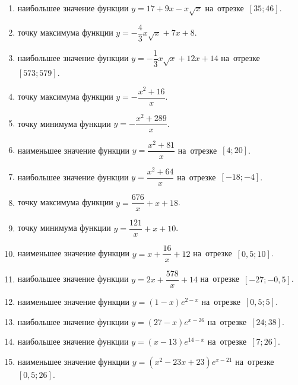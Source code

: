 \documentclass[a4paper,10pt]{article}
\begin{document}
\begin{enumerate}
\item {} наибольшее значение функции $y=17+9x -x\sqrt{x}$ на~отрезке~$\left[35;46\right]$.

\item {} точку максимума функции $y=-\dfrac{4}{3}x\sqrt{x} +7x+8$.

\item {} наибольшее значение функции $y=-\dfrac{1}{3}x\sqrt{x} +12x+14$ на~отрезке~$\left[573;579\right]$.

\item {} точку максимума функции $y=-\dfrac{x^2 +16}{x}$.

\item {} точку минимума функции $y=-\dfrac{x^2 +289}{x}$.

\item {} наименьшее значение функции $y=\dfrac{x^2 +81}{x}$ на~отрезке~$\left[4;20\right]$.

\item {} наибольшее значение функции $y=\dfrac{x^2 +64}{x}$ на~отрезке~$\left[-18;-4\right]$.

\item {} точку максимума функции $y=\dfrac{676}{x} +x+18$.

\item {} точку минимума функции $y=\dfrac{121}{x} +x+10$.

\item {} наименьшее значение функции $y=x+\dfrac{16}{x} +12$ на~отрезке~$\left[0,5;10\right]$.

\item {} наибольшее значение функции $y=2x+\dfrac{578}{x} +14$ на~отрезке~$\left[-27;-0,5\right]$.

\item {} наименьшее значение функции $y=\left(1-x\right)e^{2-x}$ на~отрезке~$\left[0,5;5\right]$.

\item {} наибольшее значение функции $y=\left(27-x\right)e^{x-26}$ на~отрезке~$\left[24;38\right]$.

\item {} наибольшее значение функции $y=\left(x-13\right)e^{14-x}$ на~отрезке~$\left[7;26\right]$.

\item {} наименьшее значение функции $y=\left(x^2 -23x +23\right)e^{x -21}$ на~отрезке~$\left[0,5;26\right]$.


\end{enumerate}
\end{document}
